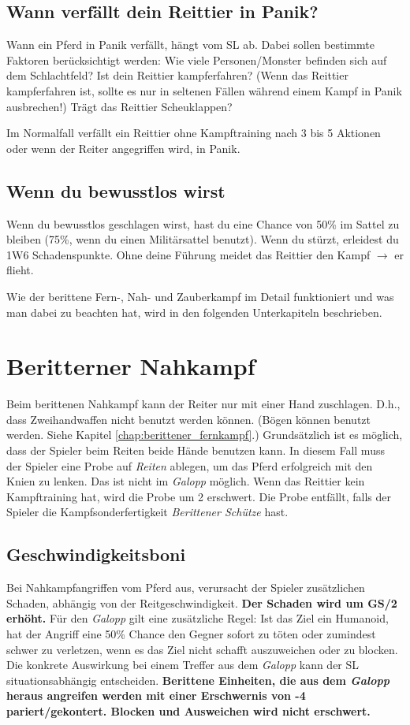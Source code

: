 \subsection{Wann verfällt dein Reittier in Panik?} 
Wann ein Pferd in Panik verfällt, hängt vom SL ab. Dabei sollen bestimmte Faktoren berücksichtigt werden: Wie viele Personen/Monster befinden sich auf dem Schlachtfeld? Ist dein Reittier kampferfahren? (Wenn das Reittier kampferfahren ist, sollte es nur in seltenen Fällen während einem Kampf in Panik ausbrechen!) Trägt das Reittier Scheuklappen?

Im Normalfall verfällt ein Reittier ohne Kampftraining nach 3 bis 5 Aktionen oder wenn der Reiter angegriffen wird, in Panik.

\subsection{Wenn du bewusstlos wirst} 
Wenn du bewusstlos geschlagen wirst, hast du eine Chance von 50\% im Sattel zu bleiben (75\%, wenn du einen Militärsattel benutzt). Wenn du stürzt, erleidest du 1W6 Schadenspunkte. Ohne deine Führung meidet das Reittier den Kampf $\rightarrow$ er flieht.

Wie der berittene Fern-, Nah- und Zauberkampf im Detail funktioniert und was man dabei zu beachten hat, wird in den folgenden Unterkapiteln beschrieben.


\section{Beritterner Nahkampf}
Beim berittenen Nahkampf kann der Reiter nur mit einer Hand zuschlagen. D.h., dass Zweihandwaffen nicht benutzt werden können. (Bögen können benutzt werden. Siehe Kapitel \ref{chap:berittener_fernkampf}.) Grundsätzlich ist es möglich, dass der Spieler beim Reiten beide Hände benutzen kann. In diesem Fall muss der Spieler eine Probe auf \textit{Reiten} ablegen, um das Pferd erfolgreich mit den Knien zu lenken. Das ist nicht im \textit{Galopp} möglich. Wenn das Reittier kein Kampftraining hat, wird die Probe um 2 erschwert. Die Probe entfällt, falls der Spieler die Kampfsonderfertigkeit \textit{Berittener Schütze} hast.

\subsection{Geschwindigkeitsboni}
Bei Nahkampfangriffen vom Pferd aus, verursacht der Spieler zusätzlichen Schaden, abhängig von der Reitgeschwindigkeit. \textbf{Der Schaden wird um GS/2 erhöht.} Für den \textit{Galopp} gilt eine zusätzliche Regel: Ist das Ziel ein Humanoid, hat der Angriff eine 50\% Chance den Gegner sofort zu töten oder zumindest schwer zu verletzen, wenn es das Ziel nicht schafft auszuweichen oder zu blocken. Die konkrete Auswirkung bei einem Treffer aus dem \textit{Galopp} kann der SL situationsabhängig entscheiden. \textbf{Berittene Einheiten, die aus dem \textit{Galopp} heraus angreifen werden mit einer Erschwernis von -4 pariert/gekontert. Blocken und Ausweichen wird nicht erschwert.}


